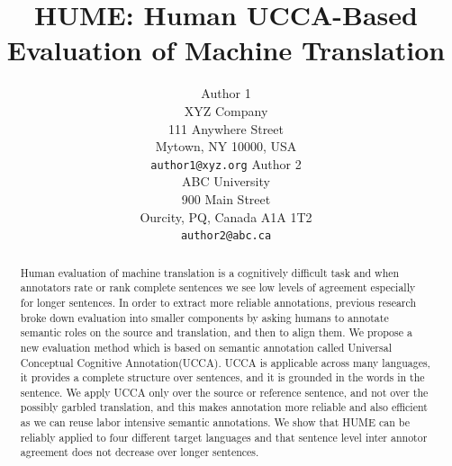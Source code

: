 \documentclass[11pt]{article}
\title{HUME: Human UCCA-Based Evaluation of Machine Translation}
\author{Author 1\\
	    XYZ Company\\
	    111 Anywhere Street\\
	    Mytown, NY 10000, USA\\
	    {\tt author1@xyz.org}
	  \And
	Author 2\\
  	ABC University\\
  	900 Main Street\\
  	Ourcity, PQ, Canada A1A 1T2\\
  {\tt author2@abc.ca}}
\date{}
\begin{document}
\maketitle

\begin{abstract}
  


Human evaluation of machine translation is a cognitively difficult task and when annotators rate or rank complete sentences we see low levels of agreement especially
for longer sentences.  
In order to extract more reliable annotations, previous research broke down evaluation into smaller components by asking humans to annotate semantic roles on the source and translation, and then to align them. 
We propose a new evaluation method which is based on semantic annotation called Universal Conceptual Cognitive Annotation(UCCA). UCCA is applicable across many languages, it provides a complete structure over sentences, and it is grounded in the words in the sentence. 
We apply UCCA only over the source or reference sentence, and not over the possibly garbled translation, 
and this makes annotation more reliable and also efficient as we can reuse labor intensive semantic annotations. We show that HUME can be reliably applied to four different target languages and that sentence level inter annotor agreement does not decrease over longer sentences. 

\end{abstract}


\end{document}
